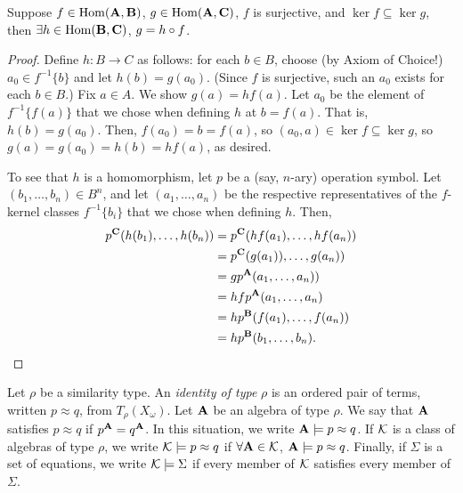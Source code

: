 \documentclass[12pt]{amsart}  %
\begin{document}
\begin{lemma}
  \label{ex:1.26.8}
  Suppose $f \in \operatorname{Hom}(\mathbf{A},\mathbf{B})$, $g \in \operatorname{Hom}(\mathbf{A},\mathbf{C})$, 
  $f$ is surjective, and $\ker f \subseteq \ker g$, then $\exists h \in \operatorname{Hom}(\mathbf{B},\mathbf{C})$, $g = h \circ f$.
\end{lemma}
\begin{proof}
Define $h\colon B \to C$ as follows: for each $b\in B$, choose (by Axiom of Choice!) $a_0\in f^{-1}\{b\}$
and let $h(b) = g(a_0)$.  (Since $f$ is surjective, such an $a_0$ exists for each $b\in B$.)
Fix $a \in A$.  We show $g(a) = h f(a)$. Let $a_0$ be the element of $f^{-1}\{f(a)\}$ that we
chose when defining $h$ at $b = f(a)$. That is, $h(b) = g(a_0)$.
Then, $f(a_0) = b = f(a)$, so $(a_0, a) \in \ker f\subseteq \ker g$, so 
$g(a) = g(a_0) = h(b) = h f(a)$, as desired.

To see that $h$ is a homomorphism, let $p$ be a (say, $n$-ary) operation symbol.
Let $(b_1, \dots, b_n) \in B^n$, and let $(a_1, \dots, a_n)$ be the respective representatives
of the $f$-kernel classes $f^{-1}\{b_i\}$ that we chose when defining $h$.
Then,
\begin{align*}
p^{\mathbf{C}}(h(b_1), \dots, h(b_n)) &=  p^{\mathbf{C}}(h f(a_1), \dots, h f(a_n))\\
&=  p^{\mathbf{C}}(g(a_1)), \dots, g(a_n))\\
&=  g p^{\mathbf{A}}(a_1, \dots, a_n))\\
&=  h f p^{\mathbf{A}}(a_1, \dots, a_n)\\
&=  h p^{\mathbf{B}}(f(a_1), \dots, f(a_n))\\
&=  h p^{\mathbf{B}}(b_1, \dots, b_n).
\end{align*}
\end{proof}


\begin{definition}
Let $\rho$ be a similarity type. 
An \emph{identity of type} $\rho$ is an ordered pair of terms, written 
$p \approx q$, from $T_\rho(X_\omega)$. Let $\mathbf{A}$ be an algebra of type $\rho$.
We say that $\mathbf{A}$ satisfies $p\approx q$ if $p^{\mathbf{A}} = q^{\mathbf{A}}$. 
In this situation, we write $\mathbf{A} \models p \approx q$.
If $\mathcal{K}$ is a class of algebras of type $\rho$, we write 
$\mathcal{K} \models p \approx q$ if $\forall \mathbf{A} \in \mathcal{K}$, 
$\mathbf{A} \models p \approx q$. Finally, if $\Sigma$ is a set of equations, 
we write $\mathcal{K} \models \Sigma$ if every member of $\mathcal{K}$ satisfies
every member of $\Sigma$.
\end{definition}
\end{document}
